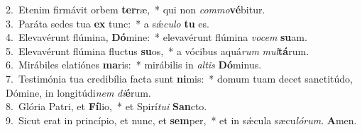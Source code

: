 {2.~}Etenim firmávit orbem \textbf{ter}ræ,~* qui non \textit{com}\textit{mo}\textbf{vé}bitur.\\
{3.~}Paráta sedes tua \textbf{ex} tunc:~* a sǽ\textit{cu}\textit{lo} \textbf{tu} es.\\
{4.~}Elevavérunt flúmina, \textbf{Dó}mine:~* elevavérunt flúmina \textit{vo}\textit{cem} \textbf{su}am.\\
{5.~}Elevavérunt flúmina fluctus \textbf{su}os,~* a vócibus aquá\textit{rum} \textit{mul}\textbf{tá}rum.\\
{6.~}Mirábiles elatiónes \textbf{ma}ris:~* mirábilis in \textit{al}\textit{tis} \textbf{Dó}minus.\\
{7.~}Testimónia tua credibília facta sunt \textbf{ni}mis:~* domum tuam decet sanctitúdo, Dómine, in longitúdi\textit{nem} \textit{di}\textbf{é}rum.\\
{8.~}Glória Patri, et \textbf{Fí}lio,~* et Spirí\textit{tu}\textit{i} \textbf{San}cto.\\
{9.~}Sicut erat in princípio, et nunc, et \textbf{sem}per,~* et in sǽcula sæcu\textit{ló}\textit{rum}. \textbf{A}men.\\
